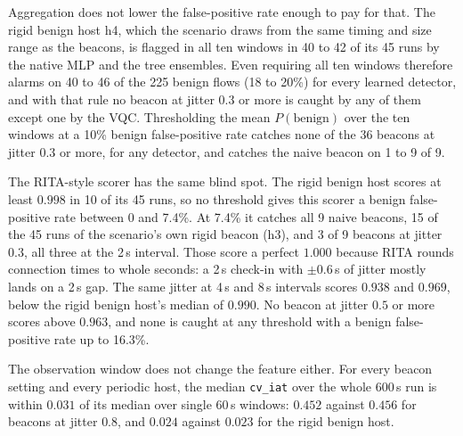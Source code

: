 \documentclass[preprint,12pt]{elsarticle}
\begin{document}
Aggregation does not lower the false-positive rate enough to pay for that. The rigid benign host h4,
which the scenario draws from the same timing and size range as the beacons, is flagged in all ten
windows in 40 to 42 of its 45 runs by the native MLP and the tree ensembles. Even requiring all ten
windows therefore alarms on 40 to 46 of the 225 benign flows (18 to 20\%) for every learned detector,
and with that rule no beacon at jitter $0.3$ or more is caught by any of them except one by the VQC.
Thresholding the mean $P(\text{benign})$ over the ten windows at a 10\% benign false-positive rate
catches none of the 36 beacons at jitter $0.3$ or more, for any detector, and catches the naive beacon
on 1 to 9 of 9.

The RITA-style scorer has the same blind spot. The rigid benign host scores at least $0.998$ in 10 of
its 45 runs, so no threshold gives this scorer a benign false-positive rate between 0 and 7.4\%. At
7.4\% it catches all 9 naive beacons, 15 of the 45 runs of the scenario's own rigid beacon (h3), and 3
of 9 beacons at jitter $0.3$, all three at the 2\,s interval. Those score a perfect $1.000$ because
RITA rounds connection times to whole seconds: a 2\,s check-in with $\pm0.6$\,s of jitter mostly lands
on a 2\,s gap. The same jitter at 4\,s and 8\,s intervals scores $0.938$ and $0.969$, below the rigid
benign host's median of $0.990$. No beacon at jitter $0.5$ or more scores above $0.963$, and none is
caught at any threshold with a benign false-positive rate up to 16.3\%.

The observation window does not change the feature either. For every beacon setting and every periodic
host, the median \texttt{cv\_iat} over the whole 600\,s run is within $0.031$ of its median over single
60\,s windows: $0.452$ against $0.456$ for beacons at jitter $0.8$, and $0.024$ against $0.023$ for the
rigid benign host.
\end{document}
